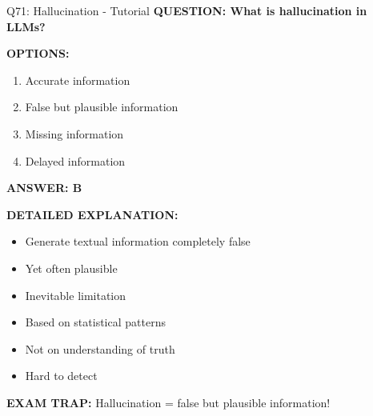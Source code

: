 \documentclass[8pt]{beamer}
\begin{document}
	\begin{frame}{Q71: Hallucination - Tutorial}
		\fontsize{6.5}{7.5}\selectfont
		\textbf{QUESTION: What is hallucination in LLMs?}
		
		\vspace{0.1cm}
		\textbf{OPTIONS:}
		\begin{enumerate}
			\item Accurate information
			\item False but plausible information
			\item Missing information
			\item Delayed information
		\end{enumerate}
		
		\vspace{0.1cm}
		\textcolor{myblue}{\textbf{ANSWER: B}}
		
		\vspace{0.1cm}
		\textbf{DETAILED EXPLANATION:}
		\begin{itemize}
			\item Generate textual information completely false
			\item Yet often plausible
			\item Inevitable limitation
			\item Based on statistical patterns
			\item Not on understanding of truth
			\item Hard to detect
		\end{itemize}
		
		\vspace{0.1cm}
		\textcolor{myred}{\textbf{EXAM TRAP:}} Hallucination = \textcolor{myblue}{false but plausible information}!
	\end{frame}
	
\end{document}
